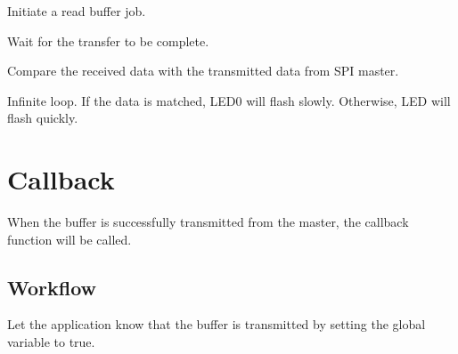 \begin{DoxyEnumerate}
\item Initiate a read buffer job. 
\begin{DoxyCodeInclude}{0}
\end{DoxyCodeInclude}

\item Wait for the transfer to be complete. 
\begin{DoxyCodeInclude}{0}
\end{DoxyCodeInclude}

\item Compare the received data with the transmitted data from S\+PI master. 
\begin{DoxyCodeInclude}{0}
\end{DoxyCodeInclude}

\item Infinite loop. If the data is matched, L\+E\+D0 will flash slowly. Otherwise, L\+ED will flash quickly. 
\begin{DoxyCodeInclude}{0}
\end{DoxyCodeInclude}
 
\end{DoxyEnumerate}\hypertarget{asfdoc_sam0_sercom_spi_slave_callback_use_asfdoc_sam0_sercom_spi_slave_callback_use_callback}{}\section{Callback}\label{asfdoc_sam0_sercom_spi_slave_callback_use_asfdoc_sam0_sercom_spi_slave_callback_use_callback}
When the buffer is successfully transmitted from the master, the callback function will be called. \hypertarget{asfdoc_sam0_sercom_spi_slave_callback_use_asfdoc_sam0_sercom_spi_slave_callback_use_callback_workflow}{}\subsection{Workflow}\label{asfdoc_sam0_sercom_spi_slave_callback_use_asfdoc_sam0_sercom_spi_slave_callback_use_callback_workflow}

\begin{DoxyEnumerate}
\item Let the application know that the buffer is transmitted by setting the global variable to true. 
\begin{DoxyCodeInclude}{0}
\end{DoxyCodeInclude}

\end{DoxyEnumerate}